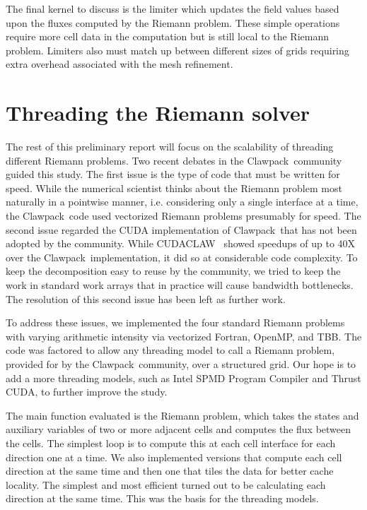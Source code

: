 \documentclass{article}
\def\clawpack{Clawpack~}
\begin{document}
The final kernel to discuss is the limiter which updates the field values based
upon the fluxes computed by the Riemann problem.  These simple operations
require more cell data in the computation but is still local to the Riemann
problem. Limiters also must match up between different sizes of grids requiring
extra overhead associated with the mesh refinement.


\section{Threading the Riemann solver}

The rest of this preliminary report will focus on the scalability of threading
different Riemann problems. Two recent debates in the \clawpack community
guided this study. The first issue is the type of code that must be written for
speed. While the numerical scientist thinks about the Riemann problem most
naturally in a pointwise manner, i.e. considering only a single interface at a
time, the \clawpack code used vectorized Riemann problems presumably for speed.
The second issue regarded the CUDA implementation of \clawpack that has not
been adopted by the community.  While CUDACLAW~\cite{CUDAClaw} showed speedups of up to 40X
over the \clawpack implementation, it did so at considerable code complexity.
To keep the decomposition easy to reuse by the community, we tried to keep the
work in standard work arrays that in practice will cause bandwidth bottlenecks.
The resolution of this second issue has been left as further work.

To address these issues, we implemented the four standard Riemann problems with
varying arithmetic intensity via vectorized Fortran, OpenMP, and TBB.  The code
was factored to allow any threading model to call a Riemann problem, provided
for by the \clawpack community, over a structured grid.  Our hope is to add a
more threading models, such as Intel SPMD Program Compiler and Thrust CUDA, to
further improve the study.

The main function evaluated is the Riemann problem, which takes the states and
auxiliary variables of two or more adjacent cells and computes the flux between
the cells.  The simplest loop is to compute this at each cell interface for
each direction one at a time.  We also implemented versions that compute each
cell direction at the same time and then one that tiles the data for better
cache locality.  The simplest and most efficient turned out to be calculating
each direction at the same time.  This was the basis for the threading models.
\end{document}

